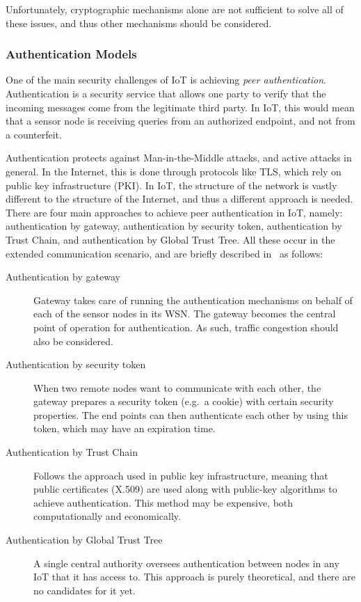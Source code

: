 \documentclass[12pt]{article}
\begin{document}
Unfortunately, cryptographic mechanisms alone are not sufficient to solve all of these issues, and thus other mechanisms should be considered.

\subsubsection{Authentication Models}

One of the main security challenges of IoT is achieving \emph{peer authentication}. Authentication is a security service that allows one party to verify that the incoming messages come from the legitimate third party. In IoT, this would mean that a sensor node is receiving queries from an authorized endpoint, and not from a counterfeit.

Authentication protects against Man-in-the-Middle attacks, and active attacks in general. In the Internet, this is done through protocols like TLS, which rely on public key infrastructure (PKI). In IoT, the structure of the network is vastly different to the structure of the Internet, and thus a different approach is needed. There are four main approaches to achieve peer authentication in IoT, namely: authentication by gateway, authentication by security token, authentication by Trust Chain, and authentication by Global Trust Tree. All these occur in the extended communication scenario, and are briefly described in~\cite{Zhang:2015} as follows:
\begin{description}
\item[Authentication by gateway] Gateway takes care of running the authentication mechanisms on behalf of each of the sensor nodes in its WSN. The gateway becomes the central point of operation for authentication. As such, traffic congestion should also be considered.
\item[Authentication by security token] When two remote nodes want to communicate with each other, the gateway prepares a security token (e.g.\ a cookie) with certain security properties. The end points can then authenticate each other by using this token, which may have an expiration time. 
\item[Authentication by Trust Chain] Follows the approach used in public key infrastructure, meaning that public certificates (X.509) are used along with public-key algorithms to achieve authentication. This method may be expensive, both computationally and economically.
\item[Authentication by Global Trust Tree] A single central authority oversees authentication between nodes in any IoT that it has access to. This approach is purely theoretical, and there are no candidates for it yet.
\end{description}
\end{document}
